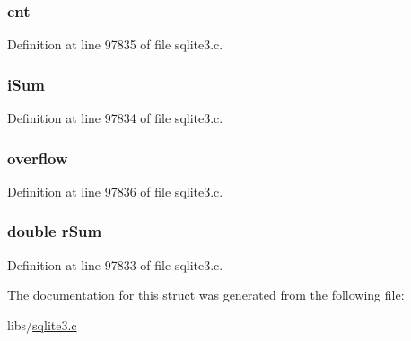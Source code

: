 \hypertarget{struct_sum_ctx_a3b004a6d42cc249c0677509e4bac537a}{}
\subsubsection[{cnt}]{ cnt}\label{struct_sum_ctx_a3b004a6d42cc249c0677509e4bac537a}


Definition at line 97835 of file sqlite3.\+c.

\hypertarget{struct_sum_ctx_af87622beff9f41a136efa9febaeb9ec3}{}
\subsubsection[{i\+Sum}]{ i\+Sum}\label{struct_sum_ctx_af87622beff9f41a136efa9febaeb9ec3}


Definition at line 97834 of file sqlite3.\+c.

\hypertarget{struct_sum_ctx_abb27716929bb243fa3d79c659124ff91}{}
\subsubsection[{overflow}]{ overflow}\label{struct_sum_ctx_abb27716929bb243fa3d79c659124ff91}


Definition at line 97836 of file sqlite3.\+c.

\hypertarget{struct_sum_ctx_af82946520b4b13cac4fea7cd5c226437}{}
\subsubsection[{r\+Sum}]{\setlength{\rightskip}{0pt plus 5cm}double r\+Sum}\label{struct_sum_ctx_af82946520b4b13cac4fea7cd5c226437}


Definition at line 97833 of file sqlite3.\+c.



The documentation for this struct was generated from the following file\+:\begin{DoxyCompactItemize}
\item 
libs/\hyperlink{sqlite3_8c}{sqlite3.\+c}\end{DoxyCompactItemize}
